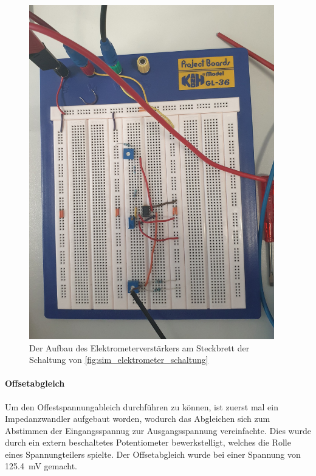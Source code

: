 \documentclass[12pt,english,ngerman]{scrartcl}
\begin{document}
\begin{figure}[H]
  \centering
    \includegraphics[width=0.95\textwidth]{./figures/elektrometer/steckbrett.png}
  \caption{Der Aufbau des Elektrometerverstärkers am Steckbrett der Schaltung von
  \autoref{fig:sim_elektrometer_schaltung}}
  \label{fig:ver_elektromete_aufbau}
\end{figure}

\paragraph{Offsetabgleich}\label{sec:offsetabgleich}
Um den Offestspannungableich durchführen zu können, ist zuerst mal ein
Impedanzwandler aufgebaut worden, wodurch das Abgleichen sich zum Abstimmen
der Eingangsspannug zur Ausgangsspannung vereinfachte. Dies wurde durch ein
extern beschaltetes Potentiometer bewerkstelligt, welches die Rolle eines
Spannungteilers spielte. Der Offsetabgleich wurde bei einer Spannung von
\SI{125.4}{\milli\volt} gemacht.
\end{document}
